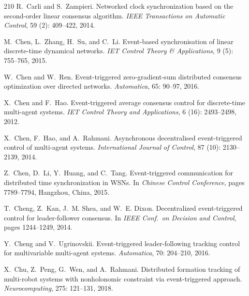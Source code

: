 \documentclass{autart}
\begin{document}
{\begin{thebibliography}{210}
R.~Carli and S.~Zampieri.
\newblock Networked clock synchronization based on the second-order linear
  consensus algorithm.
\newblock \emph{IEEE Transactions on Automatic Control}, 59
  (2): 409--422, 2014.

M.~Chen, L.~Zhang, H.~Su, and C.~Li.
\newblock Event-based synchronisation of linear discrete-time dynamical
  networks.
\newblock \emph{IET Control Theory \& Applications}, 9 (5):
  755--765, 2015{}.

W.~Chen and W.~Ren.
\newblock Event-triggered zero-gradient-sum distributed consensus optimization
  over directed networks.
\newblock \emph{Automatica}, 65: 90--97, 2016.

X.~Chen and F.~Hao.
\newblock Event-triggered average consensus control for discrete-time
  multi-agent systems.
\newblock \emph{IET Control Theory and Applications}, 6 (16):
  2493--2498, 2012.

X.~Chen, F.~Hao, and A.~Rahmani.
\newblock Asynchronous decentralised event-triggered control of multi-agent
  systems.
\newblock \emph{International Journal of Control}, 87 (10):
  2130--2139, 2014.

Z.~Chen, D.~Li, Y.~Huang, and C.~Tang.
\newblock Event-triggered communication for distributed time synchronization in
  {WSN}s.
\newblock In \emph{Chinese Control Conference}, pages 7789--7794, Hangzhou,
  China, 2015{}.

T.~Cheng, Z.~Kan, J.~M. Shea, and W.~E. Dixon.
\newblock Decentralized event-triggered control for leader-follower consensus.
\newblock In \emph{{IEEE} Conf.\ on Decision and Control}, pages 1244--1249,
  2014.

Y.~Cheng and V.~Ugrinovskii.
\newblock Event-triggered leader-following tracking control for multivariable
  multi-agent systems.
\newblock \emph{Automatica}, 70: 204--210, 2016.

X.~Chu, Z.~Peng, G.~Wen, and A.~Rahmani.
\newblock Distributed formation tracking of multi-robot systems with
  nonholonomic constraint via event-triggered approach.
\newblock \emph{Neurocomputing}, 275: 121--131, 2018.


\end{thebibliography}}
\end{document}
